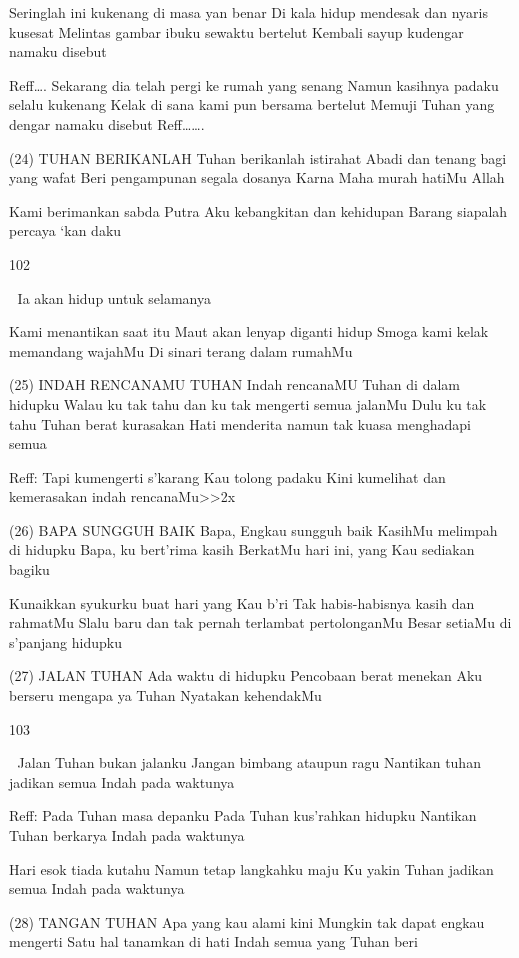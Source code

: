 \documentclass[10pt,a5paper,fancyhdr]{memoir}
\begin{document}
Seringlah ini kukenang di masa yan benar 
Di kala hidup mendesak dan nyaris kusesat 
Melintas gambar ibuku sewaktu bertelut 
Kembali sayup kudengar namaku disebut 

Reff…. 
Sekarang dia telah pergi ke rumah yang senang 
Namun kasihnya padaku selalu kukenang 
Kelak di sana kami pun bersama bertelut 
Memuji Tuhan yang dengar namaku disebut 
Reff……. 

(24) TUHAN BERIKANLAH 
Tuhan berikanlah istirahat 
Abadi dan tenang bagi yang wafat 
Beri pengampunan segala dosanya 
Karna Maha murah hatiMu Allah 

Kami berimankan sabda Putra 
Aku kebangkitan dan kehidupan 
Barang siapalah percaya ‘kan daku 

102 



Ia akan hidup untuk selamanya 

Kami menantikan saat itu 
Maut akan lenyap diganti hidup 
Smoga kami kelak memandang wajahMu 
Di sinari terang dalam rumahMu 

(25) INDAH RENCANAMU TUHAN 
Indah rencanaMU Tuhan di dalam hidupku 
Walau ku tak tahu dan ku tak mengerti semua jalanMu 
Dulu ku tak tahu Tuhan berat kurasakan 
Hati menderita namun tak kuasa menghadapi semua 

Reff: 
Tapi kumengerti s’karang Kau tolong padaku 
Kini kumelihat dan kemerasakan indah rencanaMu>>2x 

(26) BAPA SUNGGUH BAIK 
Bapa, Engkau sungguh baik 
KasihMu melimpah di hidupku 
Bapa, ku bert’rima kasih 
BerkatMu hari ini, yang Kau sediakan bagiku 

Kunaikkan syukurku buat hari yang Kau b’ri 
Tak habis-habisnya kasih dan rahmatMu 
Slalu baru dan tak pernah terlambat pertolonganMu 
Besar setiaMu di s’panjang hidupku 

(27) JALAN TUHAN 
Ada waktu di hidupku 
Pencobaan berat menekan 
Aku berseru mengapa ya Tuhan 
Nyatakan kehendakMu 

103 



Jalan Tuhan bukan jalanku 
Jangan bimbang ataupun ragu 
Nantikan tuhan jadikan semua 
Indah pada waktunya 

Reff: 
Pada Tuhan masa depanku 
Pada Tuhan kus’rahkan hidupku 
Nantikan Tuhan berkarya 
Indah pada waktunya 

Hari esok tiada kutahu 
Namun tetap langkahku maju 
Ku yakin Tuhan jadikan semua 
Indah pada waktunya 

(28) TANGAN TUHAN 
Apa yang kau alami kini 
Mungkin tak dapat engkau mengerti 
Satu hal tanamkan di hati 
Indah semua yang Tuhan beri 
\end{document}
